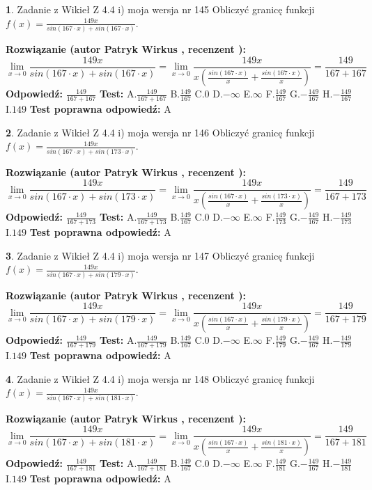\documentclass[12pt, a4paper]{article}
\theoremstyle{definition} %
\newtheorem{zad}{}
\newcommand{\zadStart}[1]{\begin{zad}#1\newline}
\newcommand{\zadStop}{\end{zad}}
\newcommand{\rozwStart}[2]{\noindent \textbf{Rozwiązanie (autor #1 , recenzent #2): }\newline}
\newcommand{\rozwStop}{\newline}
\newcommand{\odpStart}{\noindent \textbf{Odpowiedź:}\newline}
\newcommand{\odpStop}{\newline}
\newcommand{\testStart}{\noindent \textbf{Test:}\newline}
\newcommand{\testStop}{\newline}
\newcommand{\kluczStart}{\noindent \textbf{Test poprawna odpowiedź:}\newline}
\newcommand{\kluczStop}{\newline}
\begin{document}
\zadStart{Zadanie z Wikieł Z 4.4 i) moja wersja nr 145}
Obliczyć granicę funkcji $f(x)=\frac{149x}{sin(167\cdot x) +sin(167\cdot x)}$.
\zadStop
\rozwStart{Patryk Wirkus}{}
$$\lim\limits_{x\to 0}\frac{149x}{sin(167\cdot x) +sin(167\cdot x)}=\lim\limits_{x\to 0}\frac{149x}{x(\frac{sin(167\cdot x)}{x}+\frac{sin(167\cdot x)}{x})}=\frac{149}{167+167}$$
\rozwStop
\odpStart
$\frac{149}{167+167}$
\odpStop
\testStart
A.$\frac{149}{167+167}$
B.$\frac{149}{167}$
C.$0$
D.$-\infty$
E.$\infty$
F.$\frac{149}{167}$
G.$-\frac{149}{167}$
H.$-\frac{149}{167}$
I.$149$
\testStop
\kluczStart
A
\kluczStop



\zadStart{Zadanie z Wikieł Z 4.4 i) moja wersja nr 146}
Obliczyć granicę funkcji $f(x)=\frac{149x}{sin(167\cdot x) +sin(173\cdot x)}$.
\zadStop
\rozwStart{Patryk Wirkus}{}
$$\lim\limits_{x\to 0}\frac{149x}{sin(167\cdot x) +sin(173\cdot x)}=\lim\limits_{x\to 0}\frac{149x}{x(\frac{sin(167\cdot x)}{x}+\frac{sin(173\cdot x)}{x})}=\frac{149}{167+173}$$
\rozwStop
\odpStart
$\frac{149}{167+173}$
\odpStop
\testStart
A.$\frac{149}{167+173}$
B.$\frac{149}{167}$
C.$0$
D.$-\infty$
E.$\infty$
F.$\frac{149}{173}$
G.$-\frac{149}{167}$
H.$-\frac{149}{173}$
I.$149$
\testStop
\kluczStart
A
\kluczStop



\zadStart{Zadanie z Wikieł Z 4.4 i) moja wersja nr 147}
Obliczyć granicę funkcji $f(x)=\frac{149x}{sin(167\cdot x) +sin(179\cdot x)}$.
\zadStop
\rozwStart{Patryk Wirkus}{}
$$\lim\limits_{x\to 0}\frac{149x}{sin(167\cdot x) +sin(179\cdot x)}=\lim\limits_{x\to 0}\frac{149x}{x(\frac{sin(167\cdot x)}{x}+\frac{sin(179\cdot x)}{x})}=\frac{149}{167+179}$$
\rozwStop
\odpStart
$\frac{149}{167+179}$
\odpStop
\testStart
A.$\frac{149}{167+179}$
B.$\frac{149}{167}$
C.$0$
D.$-\infty$
E.$\infty$
F.$\frac{149}{179}$
G.$-\frac{149}{167}$
H.$-\frac{149}{179}$
I.$149$
\testStop
\kluczStart
A
\kluczStop



\zadStart{Zadanie z Wikieł Z 4.4 i) moja wersja nr 148}
Obliczyć granicę funkcji $f(x)=\frac{149x}{sin(167\cdot x) +sin(181\cdot x)}$.
\zadStop
\rozwStart{Patryk Wirkus}{}
$$\lim\limits_{x\to 0}\frac{149x}{sin(167\cdot x) +sin(181\cdot x)}=\lim\limits_{x\to 0}\frac{149x}{x(\frac{sin(167\cdot x)}{x}+\frac{sin(181\cdot x)}{x})}=\frac{149}{167+181}$$
\rozwStop
\odpStart
$\frac{149}{167+181}$
\odpStop
\testStart
A.$\frac{149}{167+181}$
B.$\frac{149}{167}$
C.$0$
D.$-\infty$
E.$\infty$
F.$\frac{149}{181}$
G.$-\frac{149}{167}$
H.$-\frac{149}{181}$
I.$149$
\testStop
\kluczStart
A
\kluczStop
\end{document}
